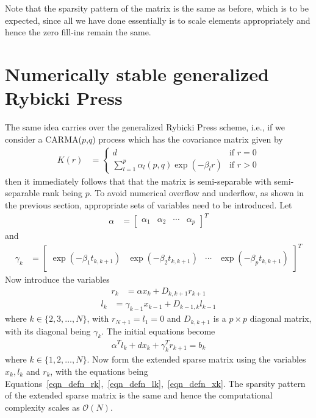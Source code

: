 \documentclass[final,leqno]{siamltex}
\begin{document}
Note that the sparsity pattern of the matrix is the same as before, which is to be expected, since all we have done essentially is to scale elements appropriately and hence the zero fill-ins remain the same.

\section{Numerically stable generalized Rybicki Press}
The same idea carries over the generalized Rybicki Press scheme, i.e., if we consider a CARMA($p$,$q$) process which has the covariance matrix given by
\begin{align}
K(r) & =
\begin{cases}
d & \text{if } r=0\\
\displaystyle \sum_{l=1}^p \alpha_l(p,q) \exp(-\beta_l r) & \text{if }r >0
\end{cases}
\end{align}
then it immediately follows that that the matrix is semi-separable with semi-separable rank being $p$. To avoid numerical overflow and underflow, as shown in the previous section, appropriate sets of variables need to be introduced. Let
\begin{align}
\alpha & = \begin{bmatrix} \alpha_1 & \alpha_2 & \cdots & \alpha_p\end{bmatrix}^T
\end{align}
and
\begin{align}
\gamma_k & = \begin{bmatrix}\exp(-\beta_1 t_{k,k+1})& \exp(-\beta_2 t_{k,k+1}) & \cdots& \exp(-\beta_p t_{k,k+1}) \end{bmatrix}^T
\end{align}
Now introduce the variables
\begin{align}
r_k & = \alpha x_k + D_{k,k+1} r_{k+1}
\label{eqn_defn_rk}
\end{align}
\begin{align}
l_{k} & = \gamma_{k-1} x_{k-1} + D_{k-1,k}l_{k-1}
\label{eqn_defn_lk}
\end{align}
where $k \in \{2,3,\ldots,N\}$, with $r_{N+1} = l_1 = 0$ and $D_{k,k+1}$ is a $p \times p$ diagonal matrix, with its diagonal being $\gamma_k$. The initial equations become
\begin{align}
\alpha^T l_k + dx_k + \gamma_k^T r_{k+1} = b_k
\label{eqn_defn_xk}
\end{align}
where $k \in \{1,2,\ldots,N\}$. Now form the extended sparse matrix using the variables $x_k,l_k$ and $r_k$, with the equations being Equations~\eqref{eqn_defn_rk},~\eqref{eqn_defn_lk},~\eqref{eqn_defn_xk}. The sparsity pattern of the extended sparse matrix is the same and hence the computational complexity scales as $\mathcal{O}(N)$.
\end{document}
